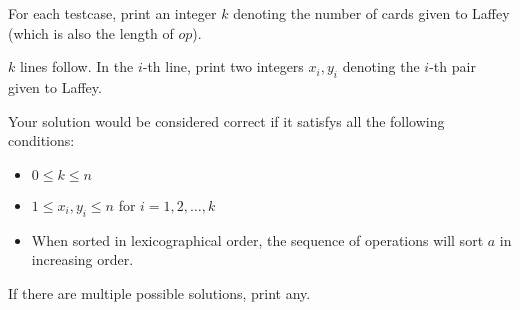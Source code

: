 For each testcase, print an integer $k$ denoting the number of cards given to Laffey (which is also the length of $op$).

$k$ lines follow.
In the $i$-th line, print two integers $x_i,y_i$ denoting the $i$-th pair given to Laffey.

Your solution would be considered correct if it satisfys all the following conditions:
\begin{itemize}
    \item $0 \leq k \leq n$
    \item $1 \leq x_i,y_i \leq n$ for $i = 1,2,\ldots,k$
    \item When sorted in lexicographical order, the sequence of operations will sort $a$ in increasing order.
\end{itemize}
If there are multiple possible solutions, print any.